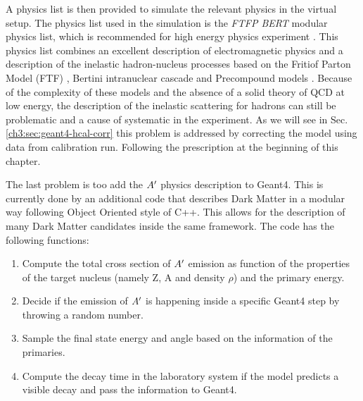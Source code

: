 A physics list is then provided to simulate the relevant physics in the virtual setup. The physics list used in the simulation is the \textit{FTFP BERT} modular physics list, which is recommended for high energy physics experiment \cite{ALLISON2016186}. This physics list combines an excellent description of electromagnetic physics and a description of the inelastic hadron-nucleus processes based on the Fritiof Parton Model (FTF) \cite{Uzhinsky:2013hea}, Bertini intranuclear cascade \cite{Heikkinen:2003sc} and Precompound models \cite{Apostolakis:2009zz}. Because of the complexity of these models and the absence of a solid theory of QCD at low energy, the description of the inelastic scattering for hadrons can still be problematic and a cause of systematic in the experiment. As we will see in Sec.\ref{ch3:sec:geant4-hcal-corr} this problem is addressed by correcting the model using data from calibration run. Following the prescription at the beginning of this chapter.

The last problem is too add the $A'$ physics description to Geant4. This is currently done by an additional code that describes Dark Matter in a modular way following Object Oriented style of C++. This allows for the description of many Dark Matter candidates inside the same framework. The code has the following functions:

\begin{enumerate}
\item Compute the total cross section of $A'$ emission as function of the properties of the target nucleus (namely Z, A and density $\rho$) and the primary energy.
\item Decide if the emission of $A'$ is happening inside a specific Geant4 step by throwing a random number.
\item Sample the final state energy and angle based on the information of the primaries.
\item Compute the decay time in the laboratory system if the model predicts a visible decay and pass the information to Geant4.
\end{enumerate}

